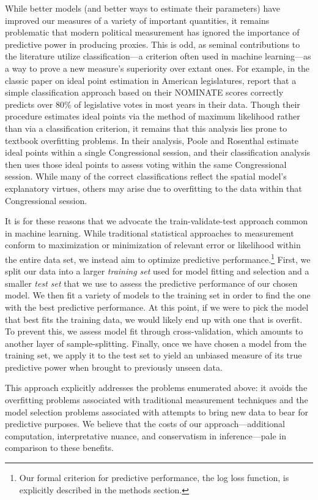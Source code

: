 While better models (and better ways to estimate their parameters) have improved our measures of a variety of important quantities, it remains problematic that modern political measurement has ignored the importance of predictive power in producing proxies.
This is odd, as seminal contributions to the literature utilize classification---a criterion often used in machine learning---as a way to prove a new measure's superiority over extant ones. For example, in the classic paper on ideal point estimation in American legislatures, \citet[Table 3]{poole1985} report that a simple classification approach based on their NOMINATE scores correctly predicts over 80\% of legislative votes in most years in their data. Though their procedure estimates ideal points via the method of maximum likelihood rather than via a classification criterion, it remains that this analysis lies prone to textbook overfitting problems.
In their analysis, Poole and Rosenthal estimate ideal points within a single Congressional session, and their classification analysis then uses those ideal points to assess voting within the same Congressional session.
While many of the correct classifications reflect the spatial model's explanatory virtues, others may arise due to overfitting to the data within that Congressional session.

It is for these reasons that we advocate the train-validate-test approach common in machine learning.
While traditional statistical approaches to measurement conform to maximization or minimization of relevant error or likelihood within the entire data set, we instead aim to optimize predictive performance.\footnote{Our formal criterion for predictive performance, the log loss function, is explicitly described in the methods section.}
First, we split our data into a larger \emph{training set} used for model fitting and selection and a smaller \emph{test set} that we use to assess the predictive performance of our chosen model.
We then fit a variety of models to the training set in order to find the one with the best predictive performance.
At this point, if we were to pick the model that best fits the training data, we would likely end up with one that is overfit.
To prevent this, we assess model fit through cross-validation, which amounts to another layer of sample-splitting.
Finally, once we have chosen a model from the training set, we apply it to the test set to yield an unbiased measure of its true predictive power when brought to previously unseen data.

This approach explicitly addresses the problems enumerated above: it avoids the overfitting problems associated with traditional measurement techniques and the model selection problems associated with attempts to bring new data to bear for predictive purposes.
We believe that the costs of our approach---additional computation, interpretative nuance, and conservatism in inference---pale in comparison to these benefits.

